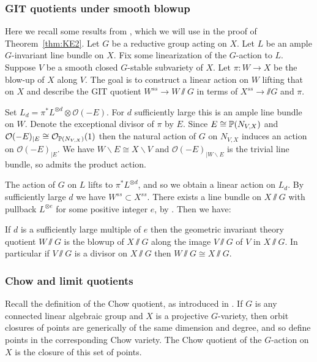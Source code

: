 \subsubsection{GIT quotients under smooth blowup}
Here we recall some results from \cite{kirwan}, which we will use in the proof of Theorem~\ref{thm:KE2}. Let \(G\) be a reductive group acting on \(X\). Let \(L\) be an ample \(G\)-invariant line bundle on \(X\). Fix some linearization of the \(G\)-action to \(L\). Suppose \(V\) be a smooth closed \(G\)-stable subvariety of \(X\). Let \(\pi:W \to X\) be the blow-up of \(X\) along \(V\). The goal is to construct a linear action on \(W\) lifting that on \(X\) and describe the GIT quotient \(W^{ss} \to W \sslash G\) in terms of \(X^{ss} \to  \sslash G\) and \(\pi\).


Set \(L_d = \pi^* L^{\otimes d} \otimes \mathcal{O}(-E)\). For \(d\) sufficiently large this is an ample line bundle on \(W\). Denote the exceptional divisor of \(\pi\) by \(E\). Since \(E \cong \mathbb{P}(N_{V,X})\) and \(\mathcal{O}(-E)_{|E} \cong \mathcal{O}_{\mathbb{P}(N_{V,X})}(1)\) then the natural action of \(G\) on \(N_{V,X}\) induces an action on \(\mathcal{O}(-E)_{|E}\). We have \(W \backslash E \cong X \backslash V\) and \(\mathcal{O}(-E)_{|W \backslash E}\) is the trivial line bundle, so admits the product action.

The action of \(G\) on \(L\) lifts to \(\pi^* L^{\otimes d} \), and so we obtain a linear action on \(L_d\). By \cite[]{kirwan} sufficiently large \(d\) we have \(W^{ss} \subset X^{ss}\). There exists a line bundle on \(X \sslash G\) with pullback \(L^{\otimes e}\) for some positive integer \(e\), by \cite{Aubin1976}. Then we have:
\begin{lemma}
If \(d\) is a sufficiently large multiple of \(e\) then the geometric invariant theory quotient \(W \sslash G\) is the blowup of \(X \sslash G\) along the image \(V \sslash G\) of \(V\) in \(X \sslash G\). In particular if \(V \sslash G\) is a divisor on \(X \sslash G\) then \(W \sslash G \cong X \sslash G\).
\end{lemma}
\subsubsection{Chow and limit quotients}
Recall the definition of the Chow quotient, as introduced in \cite{kapranov1993}. If \(G\) is any connected linear algebraic group and \(X\) is a projective \(G\)-variety, then orbit closures of points are generically of the same dimension and degree, and so define points in the corresponding Chow variety. The Chow quotient of the \(G\)-action on \(X\) is the closure of this set of points.

